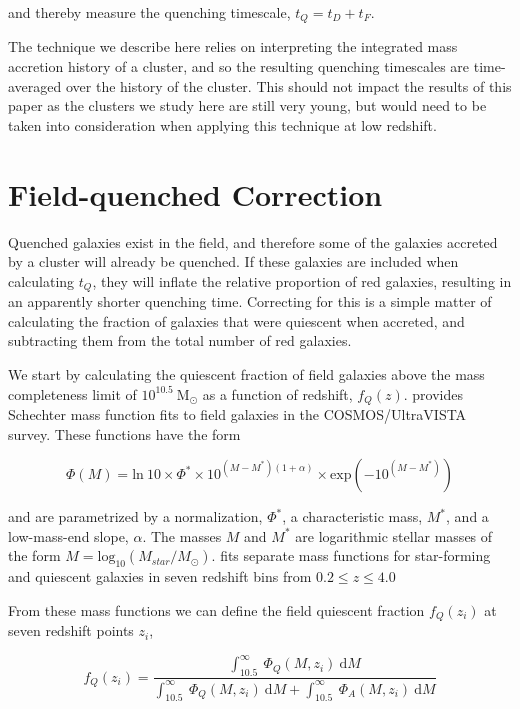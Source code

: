 and thereby measure the quenching timescale, $t_Q = t_D + t_F$.

The technique we describe here relies on interpreting the integrated mass accretion history of a cluster, and so the resulting quenching timescales are time-averaged over the history of the cluster.
This should not impact the results of this paper as the clusters we study here are still very young, but would need to be taken into consideration when applying this technique at low redshift.

\section{Field-quenched Correction}\label{sec-a-field}

Quenched galaxies exist in the field, and therefore some of the galaxies accreted by a cluster will already be quenched.
If these galaxies are included when calculating $t_Q$, they will inflate the relative proportion of red galaxies, resulting in an apparently shorter quenching time.
Correcting for this is a simple matter of calculating the fraction of galaxies that were quiescent when accreted, and subtracting them from the total number of red galaxies.

We start by calculating the quiescent fraction of field galaxies above the mass completeness limit of $10^{10.5}~ \mathrm{M}_\odot$ as a function of redshift, $f_Q(z)$.
\citet{Muzzin:2013ab} provides Schechter mass function fits to field galaxies in the COSMOS/UltraVISTA survey.
These functions have the form

\begin{equation*}
\Phi(M) = \mathrm{ln}\ 10\times\Phi^*\times10^{(M-M^*)(1+\alpha)}\times \mathrm{exp}(-10^{(M-M^*)})
\end{equation*}

and are parametrized by a normalization, $\Phi^*$, a characteristic mass, $M^*$, and a low-mass-end slope, $\alpha$.
The masses $M$ and $M^*$ are logarithmic stellar masses of the form $M=\mathrm{log}_{10}(M_{star}/M_\odot)$.
\citet{Muzzin:2013ab} fits separate mass functions for star-forming and quiescent galaxies in seven redshift bins from $0.2 \leq z \leq 4.0$

From these mass functions we can define the field quiescent fraction $f_Q(z_i)$ at seven redshift points $z_i$,

\begin{equation*}
f_Q(z_i) = \frac{\int_{10.5}^{\infty}~\Phi_Q(M, z_i)~\mathrm{d}M}{\int_{10.5}^{\infty}~\Phi_Q(M, z_i)~\mathrm{d}M+\int_{10.5}^{\infty}~\Phi_A(M, z_i)~\mathrm{d}M}
\end{equation*}

